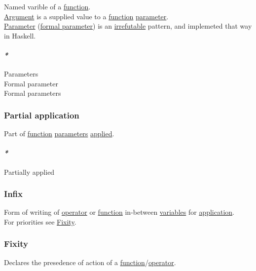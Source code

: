 \documentclass[11pt]{article}
\begin{document}
Named varible of a \hyperref[orgeb5cddb]{function}.\\

\hyperref[orgf66a5f7]{Argument} is a supplied value to a \hyperref[orgeb5cddb]{function} \hyperref[org45d4a16]{parameter}.\\

\hyperref[org45d4a16]{Parameter} (\hyperref[org12918e7]{formal parameter}) is an \hyperref[org5da5409]{irrefutable} pattern, and implemeted that way in Haskell.\\

\paragraph{\emph{*}}
\label{sec:orgbfc17b5}

\label{orgbeb3b81}Parameters\\
\label{org12918e7}Formal parameter\\
\label{org73b7ee1}Formal parameters\\

\subsubsection{\label{org523d218}Partial application}
\label{sec:orgfda99a4}
Part of \hyperref[orgeb5cddb]{function} \hyperref[orgbeb3b81]{parameters} \hyperref[org848eb1f]{applied}.\\

\paragraph{\emph{*}}
\label{sec:orgb174248}

\label{orgd8b581f}Partially applied\\

\subsubsection{\label{org80fcea9}Infix}
\label{sec:orgad64729}
Form of writing of \hyperref[org95db00b]{operator} or \hyperref[orgeb5cddb]{function} in-between \hyperref[orgd3f3ade]{variables} for \hyperref[orged2f814]{application}.\\

For priorities see \hyperref[org9303da2]{Fixity}.\\

\subsubsection{\label{org9303da2}Fixity}
\label{sec:orgf53bfd6}
Declares the presedence of action of a \hyperref[orgeb5cddb]{function}/\hyperref[org95db00b]{operator}.\\
\end{document}
